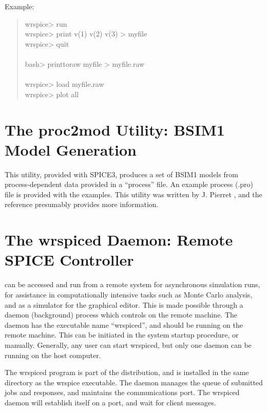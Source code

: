 Example:
\begin{quote}
{\vt wrspice> run}\\
{\vt wrspice> print v(1) v(2) v(3) > myfile}\\
{\vt wrspice> quit}\\
\\
{\vt bash> printtoraw myfile > myfile.raw}\\
\\
{\vt wrspice> load myfile.raw}\\
{\vt wrspice> plot all}
\end{quote}


\section{The {\vt proc2mod} Utility: BSIM1 Model Generation}


This utility, provided with SPICE3, produces a set of BSIM1 models
from process-dependent data provided in a ``process'' file.  An
example process ({\vt .pro}) file is provided with the {\WRspice}
examples.  This utility was written by J.  Pierret \cite{pierret},
and the reference presumably provides more information.


\section{The {\vt wrspiced} Daemon: Remote SPICE Controller}
\label{wrspiced}


{\WRspice} can be accessed and run from a remote system for
asynchronous simulation runs, for assistance in computationally
intensive tasks such as Monte Carlo analysis, and as a simulator for
the {\Xic} graphical editor.  This is made possible through a daemon
(background) process which controls {\WRspice} on the remote machine. 
The daemon has the executable name ``{\vt wrspiced}'', and should be
running on the remote machine.  This can be initiated in the system
startup procedure, or manually.  Generally, any user can start {\vt
wrspiced}, but only one daemon can be running on the host computer.

The {\vt wrspiced} program is part of the {\WRspice} distribution, and
is installed in the same directory as the {\vt wrspice} executable. 
The daemon manages the queue of submitted jobs and responses, and
maintains the communications port.  The {\vt wrspiced} daemon will
establish itself on a port, and wait for client messages.

